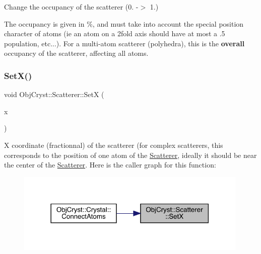 Change the occupancy of the scatterer (0. -\/$>$ 1.) 

The occupancy is given in \%, and must take into account the \textquotesingle{}special position\textquotesingle{} character of atoms (ie an atom on a 2fold axis should have at most a .5 population, etc...). For a multi-\/atom scatterer (polyhedra), this is the {\bfseries{overall}} occupancy of the scatterer, affecting all atoms. \mbox{\label{class_obj_cryst_1_1_scatterer_aff5316d7c3bdfe1122c7182a5fa74c55}} 
\subsubsection{\texorpdfstring{SetX()}{SetX()}}
{\footnotesize\ttfamily void Obj\+Cryst\+::\+Scatterer\+::\+SetX (\begin{DoxyParamCaption}\item[{const R\+E\+AL}]{x }\end{DoxyParamCaption})\hspace{0.3cm}{\ttfamily [virtual]}}

X coordinate (fractionnal) of the scatterer (for complex scatterers, this corresponds to the position of one atom of the \mbox{\hyperlink{class_obj_cryst_1_1_scatterer}{Scatterer}}, ideally it should be near the center of the \mbox{\hyperlink{class_obj_cryst_1_1_scatterer}{Scatterer}}. Here is the caller graph for this function\+:
\nopagebreak
\begin{figure}[H]
\begin{center}
\leavevmode
\includegraphics[width=314pt]{class_obj_cryst_1_1_scatterer_aff5316d7c3bdfe1122c7182a5fa74c55_icgraph}
\end{center}
\end{figure}
\mbox{\label{class_obj_cryst_1_1_scatterer_a4be726a73ee8c60ed3d2efbcdbddec0b}} 
